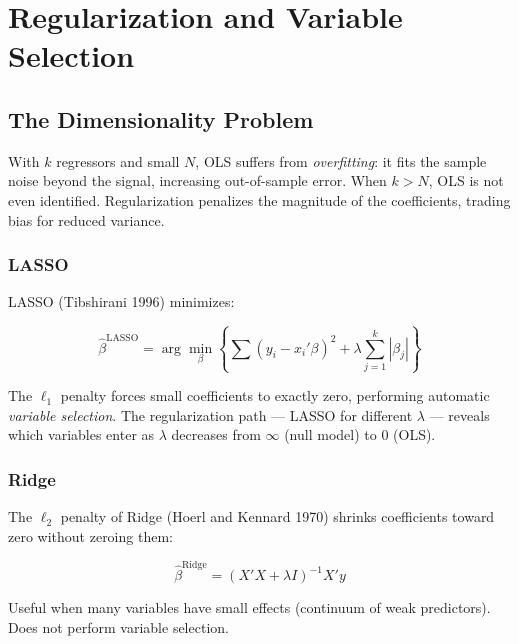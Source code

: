 \chapter{Regularization and Variable Selection}
\label{cap:regularizacao}

\section{The Dimensionality Problem}

With $k$ regressors and small $N$, OLS suffers from \emph{overfitting}: it fits
the sample noise beyond the signal, increasing out-of-sample error. When
$k > N$, OLS is not even identified. Regularization penalizes the magnitude of
the coefficients, trading bias for reduced variance.

\subsection*{LASSO}

LASSO (Tibshirani 1996) minimizes:

\[
  \hat\beta^{\mathrm{LASSO}} = \arg\min_\beta \left\{ \sum(y_i - x_i'\beta)^2
  + \lambda \sum_{j=1}^k |\beta_j| \right\}
\]

The $\ell_1$ penalty forces small coefficients to exactly zero, performing
automatic \emph{variable selection}. The regularization path — LASSO for
different $\lambda$ — reveals which variables enter as $\lambda$ decreases
from $\infty$ (null model) to 0 (OLS).

\subsection*{Ridge}

The $\ell_2$ penalty of Ridge (Hoerl and Kennard 1970) shrinks coefficients
toward zero without zeroing them:

\[
  \hat\beta^{\mathrm{Ridge}} = (X'X + \lambda I)^{-1} X'y
\]

Useful when many variables have small effects (continuum of weak predictors).
Does not perform variable selection.

